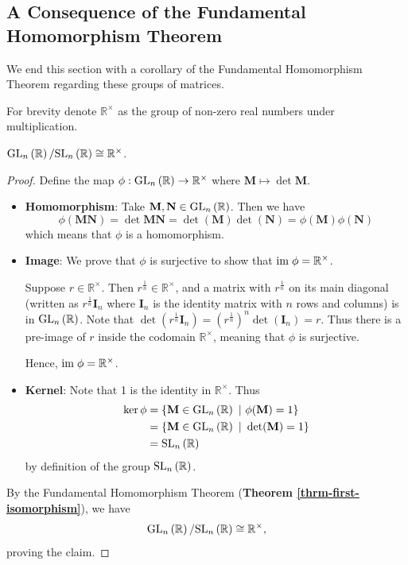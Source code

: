 \subsection{A Consequence of the Fundamental Homomorphism Theorem}
We end this section with a corollary of the Fundamental Homomorphism Theorem regarding these groups of matrices. 

For brevity denote $\mathbb{R}^\times$ as the group of non-zero real numbers under multiplication.

\begin{proposition}
    $\mathrm{GL}_{n}\left(\mathbb{R}\right) / \mathrm{SL}_{n}\left(\mathbb{R}\right) \cong \mathbb{R}^\times$.
\end{proposition}
\begin{proof}
    Define the map $\phi: \mathrm{GL}_{n}\left(\mathbb{R}\right) \to \mathbb{R}^\times$ where $\textbf{M} \mapsto \det\textbf{M}$.
	\begin{itemize}
	    \item \textbf{Homomorphism}: Take $\textbf{M}, \textbf{N} \in \mathrm{GL}_{n}\left(\mathbb{R}\right)$. Then we have
	    \[
	        \phi(\textbf{MN}) = \det \textbf{MN} = \det(\textbf{M})\det(\textbf{N}) = \phi(\textbf{M})\phi(\textbf{N})
	    \]
	    which means that $\phi$ is a homomorphism.

	    \item \textbf{Image}: We prove that $\phi$ is surjective to show that $\mathrm{im}\; \phi = \mathbb{R}^\times$.

	    Suppose $r \in \mathbb{R}^\times$. Then $r^{\frac1n} \in \mathbb{R}^\times$, and a matrix with $r^{\frac1n}$ on its main diagonal (written as $r^{\frac1n}\textbf{I}_n$ where $\textbf{I}_n$ is the identity matrix with $n$ rows and columns) is in $\mathrm{GL}_{n}\left(\mathbb{R}\right)$. Note that $\det(r^{\frac1n}\textbf{I}_n) = \left(r^{\frac1n}\right)^n\det(\textbf{I}_n) = r$. Thus there is a pre-image of $r$ inside the codomain $\mathbb{R}^\times$, meaning that $\phi$ is surjective.

	    Hence, $\mathrm{im}\; \phi = \mathbb{R}^\times$.

	    \item \textbf{Kernel}: Note that 1 is the identity in $\mathbb{R}^\times$. Thus
	    \begin{align*}
	        \ker\phi &= \{\textbf{M} \in \mathrm{GL}_{n}\left(\mathbb{R}\right) \ | \  \phi(\textbf{M}) = 1\} \\
	        &= \{\textbf{M} \in \mathrm{GL}_{n}\left(\mathbb{R}\right) \ | \  \det(\textbf{M}) = 1\}\\
	        &= \mathrm{SL}_{n}\left(\mathbb{R}\right)
	    \end{align*}
	    by definition of the group $\mathrm{SL}_{n}\left(\mathbb{R}\right)$.
	\end{itemize}
	By the Fundamental Homomorphism Theorem (\textbf{Theorem \ref{thrm-first-isomorphism}}), we have
	\[
	    \mathrm{GL}_{n}\left(\mathbb{R}\right) / \mathrm{SL}_{n}\left(\mathbb{R}\right) \cong \mathbb{R}^\times,
	\]
	proving the claim.
\end{proof}

